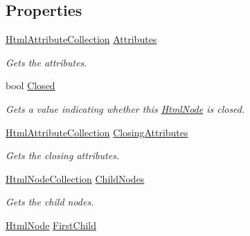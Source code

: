 \subsection*{Properties}
\begin{DoxyCompactItemize}
\item 
\hyperlink{class_html_agility_pack_1_1_html_attribute_collection}{Html\+Attribute\+Collection} \hyperlink{class_html_agility_pack_1_1_html_node_abe54404294965874de2a81fcd688ce57}{Attributes}
\begin{DoxyCompactList}\small\item\em Gets the attributes. \end{DoxyCompactList}\item 
bool \hyperlink{class_html_agility_pack_1_1_html_node_a3b55e5c3415dcc856d3f626a5ed2e199}{Closed}
\begin{DoxyCompactList}\small\item\em Gets a value indicating whether this \hyperlink{class_html_agility_pack_1_1_html_node}{Html\+Node} is closed. \end{DoxyCompactList}\item 
\hyperlink{class_html_agility_pack_1_1_html_attribute_collection}{Html\+Attribute\+Collection} \hyperlink{class_html_agility_pack_1_1_html_node_af69a960d1ba040bb3c3ca20de77c9985}{Closing\+Attributes}
\begin{DoxyCompactList}\small\item\em Gets the closing attributes. \end{DoxyCompactList}\item 
\hyperlink{class_html_agility_pack_1_1_html_node_collection}{Html\+Node\+Collection} \hyperlink{class_html_agility_pack_1_1_html_node_a9b94d340cbee23ed89b02e926be5a499}{Child\+Nodes}
\begin{DoxyCompactList}\small\item\em Gets the child nodes. \end{DoxyCompactList}\item 
\hyperlink{class_html_agility_pack_1_1_html_node}{Html\+Node} \hyperlink{class_html_agility_pack_1_1_html_node_a7560c3d7ddfa1e3b022bb3a6af05f4b2}{First\+Child}

\end{DoxyCompactItemize}
